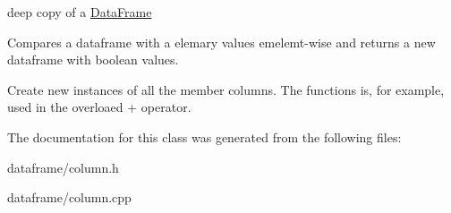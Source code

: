deep copy of a \hyperlink{classDataFrame}{Data\+Frame} 

Compares a dataframe with a elemary values emelemt-\/wise and returns a new dataframe with boolean values.

Create new instances of all the member columns. The functions is, for example, used in the overloaed + operator. 

The documentation for this class was generated from the following files\+:\begin{DoxyCompactItemize}
\item 
dataframe/column.\+h\item 
dataframe/column.\+cpp\end{DoxyCompactItemize}
